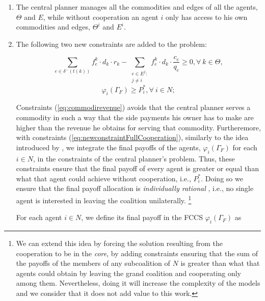 \documentclass{article}
\begin{document}
\begin{enumerate}
	\item The central planner manages all the commodities and edges of all the agents, $\Theta$ and $E$, while without cooperation an agent $i$ only has access to his own commodities and edges, $\Theta^i$ and $E^i$.
	\item The following two new constraints are added to the problem:

\begin{equation}
\sum_{e \in \delta^-(t(k))}  f_e^k \cdot d_k \cdot r_k - \sum_{\substack{e \in E^j\colon \\ j\not = i}} f_e^k \cdot d_k \cdot \frac{c_e}{q_e}\geq 0,  \forall\ k \in \Theta, \label{eq:commodirevenue}
\end{equation}
\begin{equation}
\varphi_i(\Gamma_F) \geq P_i^*,  \forall\ i\in N; \label{eq:newconstraintFullCooperation}
\end{equation}

Constraints (\ref{eq:commodirevenue}) avoids that the central planner serves a commodity in such a way that the side payments his owner has to make are higher than the revenue he obtains for serving that commodity. Furtheremore, with constraints (\ref{eq:newconstraintFullCooperation}), similarly to the idea introduced by \textcite{VANOVERMEIRE2014125}, we integrate the final payoffs of the agents, $\varphi_i(\Gamma_F)$ for each $i \in N$, in the constraints of the central planner's problem. Thus, these constraints  ensure that the final payoff of every agent is greater or equal than what that agent could achieve without cooperation, i.e., $P_i^*$.  Doing so we ensure that the final payoff allocation is \emph{individually rational} \parencite{GONZALEZ2010}, i.e., no single agent is interested in leaving the coalition unilaterally.  \footnote{We can extend this idea by forcing the solution resulting from the cooperation to be in the \emph{core}, by adding constraints ensuring that the sum of the payoffs of the members of any subcoalition of $N$ is greater than what that agents could obtain by leaving the grand coalition and cooperating only among them. Nevertheless, doing it will increase the complexity of the models and we consider that it does not add value to this work.}

For each agent $i\in N$, we define its final payoff in the FCCS $\varphi_i(\Gamma_F)$ as


\end{enumerate}
\end{document}
